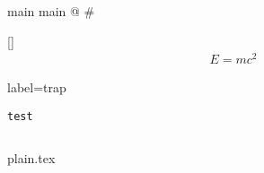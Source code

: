 \documentclass[10pt]{article}
\begin{document}
main main
@
#

\ref{}
\begin{align}
E = mc^{2}
\end{align}
\begin{frame}[label={frame}]label={trap}\end{frame}
\lstinline[showlines]{test}
\begin{lstlisting}[print]
\end{lstlisting}


{plain.tex}

\end{document}

